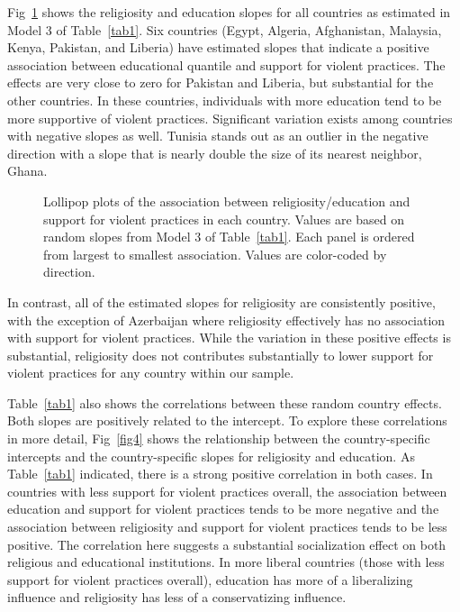 \documentclass[10pt,letterpaper]{article}
\begin{document}
Fig~\ref{fig3} shows the religiosity and education slopes for all countries as estimated in Model 3 of Table~\ref{tab1}. Six countries (Egypt, Algeria, Afghanistan, Malaysia, Kenya, Pakistan, and Liberia) have estimated slopes that indicate a positive association between educational quantile and support for violent practices. The effects are very close to zero for Pakistan and Liberia, but substantial for the other countries. In these countries, individuals with more education tend to be more supportive of violent practices. Significant variation exists among countries with negative slopes as well. Tunisia stands out as an outlier in the negative direction with a slope that is nearly double the size of its nearest neighbor, Ghana.

\begin{figure}[!h]
\centering
\caption{Lollipop plots of the association between religiosity/education
and support for violent practices in each country. Values are based on
random slopes from Model 3 of Table~\ref{tab1}. Each panel is ordered from
largest to smallest association. Values are color-coded by direction.}
\label{fig3}
\end{figure}

In contrast, all of the estimated slopes for religiosity are
consistently positive, with the exception of Azerbaijan where
religiosity effectively has no association with support for violent
practices. While the variation in these positive effects is substantial,
religiosity does not contributes substantially to lower support for
violent practices for any country within our sample.

Table~\ref{tab1} also shows the correlations between these random country
effects. Both slopes are positively related to the intercept. To explore
these correlations in more detail, Fig~\ref{fig4} shows the relationship
between the country-specific intercepts and the country-specific slopes
for religiosity and education. As Table~\ref{tab1} indicated, there is a strong
positive correlation in both cases. In countries with less support for
violent practices overall, the association between education and support
for violent practices tends to be more negative and the association
between religiosity and support for violent practices tends to be less
positive. The correlation here suggests a substantial socialization
effect on both religious and educational institutions. In more liberal
countries (those with less support for violent practices overall),
education has more of a liberalizing influence and religiosity has less
of a conservatizing influence.
\end{document}
